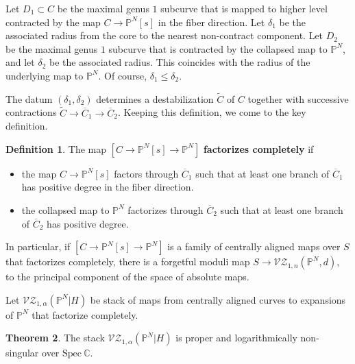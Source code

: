 \documentclass[11pt]{amsart}
\renewcommand{\to}{\rightarrow}
\theoremstyle{definition}
\newtheorem{thm}{Theorem}[section]
\theoremstyle{definition}
\newtheorem{definition}[thm]{Definition}
\begin{document}
Let $D_1\subset C$ be the maximal genus $1$ subcurve that is mapped to higher level contracted by the map $C\to \mathbb P^N[s]$ in the fiber direction. Let $\delta_1$ be the associated radius from the core to the nearest non-contract component. Let $D_2$ be the maximal genus $1$ subcurve that is contracted by the collapsed map to $\mathbb P^N$, and let $\delta_2$ be the associated radius. This coincides with the radius of the underlying map to $\mathbb P^N$. Of course, $\delta_1\leq \delta_2$.

The datum $(\delta_1,\delta_2)$ determines a destabilization $\widetilde C$ of $C$ together with successive contractions $\widetilde C\to \overline C_1\to\overline C_2$. Keeping this definition, we come to the key definition.

\begin{definition}
The map $[C\to \mathbb P^N[s]\to \mathbb P^N]$ \textbf{factorizes completely} if
\begin{itemize}
\item the map $C\to \mathbb P^N[s]$ factors through $\overline C_1$ such that at least one branch of $\overline C_1$ has positive degree in the fiber direction. 
\item the collapsed map to $\mathbb P^N$ factorizes through $\overline C_2$ such that at least one branch of $\overline C_2$ has positive degree.
\end{itemize}
\end{definition}

In particular, if $[C\to \mathbb P^N[s]\to \mathbb P^N]$ is a family of centrally aligned maps over $S$ that factorizes completely, there is a forgetful moduli map $S\to \mathcal{VZ}_{1,n}(\mathbb P^N,d)$, to the principal component of the space of absolute maps.

Let $\mathcal{VZ}_{1,\alpha}(\mathbb P^N|H)$ be stack of maps from centrally aligned curves to expansions of $\mathbb P^N$ that factorize completely.

\begin{thm}\label{thm: log-smoothness}
The stack $\mathcal{VZ}_{1,\alpha}(\mathbb P^N|H)$ is proper and logarithmically non-singular over $\mathrm{Spec} \ \mathbb C$. 
\end{thm}
\end{document}
